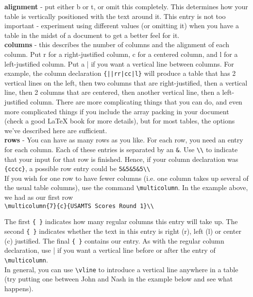\textbf{alignment} - put either b or t, or omit this completely. This determines how your table is vertically positioned with the text around it. This entry is not too important - experiment using different values (or omitting it) when you have a table in the midst of a document to get a better feel for it.\\

\textbf{columns} - this describes the number of columns and the alignment of each column. Put r for a right-justified column, c for a centered column, and l for a left-justified column. Put a | if you want a vertical line between columns. For example, the column declaration \verb+{||rr|cc|l}+ will produce a table that has 2 vertical lines on the left, then two columns that are right-justified, then a vertical line, then 2 columns that are centered, then another vertical line, then a left-justified column. There are more complicating things that you can do, and even more complicated things if you include the array packing in your document (check a good LaTeX book for more details), but for most tables, the options we've described here are sufficient.\\

\textbf{rows} - You can have as many rows as you like. For each row, you need an entry for each column. Each of these entries is separated by an \verb+&+. Use \verb+\\+ to indicate that your input for that row is finished. Hence, if your column declaration was \verb+{cccc}+, a possible row entry could be \verb+5&5&5&5\\+
\\

If you wish for one row to have fewer columns (i.e. one column takes up several of the usual table columns), use the command \verb+\multicolumn+. In the example above, we had as our first row\\

\verb+\multicolumn{7}{c}{USAMTS Scores Round 1}\\+

The first \verb+{ }+ indicates how many regular columns this entry will take up. The second \verb+{ }+ indicates whether the text in this entry is right (r), left (l) or center (c) justified. The final \verb+{ }+ contains our entry. As with the regular column declaration, use | if you want a vertical line before or after the entry of \verb+\multicolumn+.\\

In general, you can use \verb+\vline+ to introduce a vertical line anywhere in a table (try putting one between John and Nash in the example below and see what happens).\\

